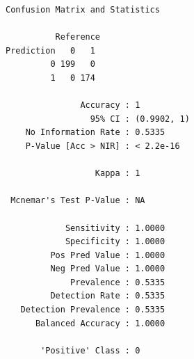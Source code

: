 \documentclass[
  letterpaper,
  DIV=11,
  numbers=noendperiod]{scrartcl}
\newenvironment{Shaded}{\begin{snugshade}}{\end{snugshade}}
\newcommand{\AttributeTok}[1]{\textcolor[rgb]{0.40,0.45,0.13}{#1}}
\newcommand{\FunctionTok}[1]{\textcolor[rgb]{0.28,0.35,0.67}{#1}}
\newcommand{\NormalTok}[1]{\textcolor[rgb]{0.00,0.23,0.31}{#1}}
\newcommand{\OtherTok}[1]{\textcolor[rgb]{0.00,0.23,0.31}{#1}}
\newcommand{\SpecialCharTok}[1]{\textcolor[rgb]{0.37,0.37,0.37}{#1}}
\begin{document}
\begin{verbatim}
Confusion Matrix and Statistics

          Reference
Prediction   0   1
         0 199   0
         1   0 174
                                     
               Accuracy : 1          
                 95% CI : (0.9902, 1)
    No Information Rate : 0.5335     
    P-Value [Acc > NIR] : < 2.2e-16  
                                     
                  Kappa : 1          
                                     
 Mcnemar's Test P-Value : NA         
                                     
            Sensitivity : 1.0000     
            Specificity : 1.0000     
         Pos Pred Value : 1.0000     
         Neg Pred Value : 1.0000     
             Prevalence : 0.5335     
         Detection Rate : 0.5335     
   Detection Prevalence : 0.5335     
      Balanced Accuracy : 1.0000     
                                     
       'Positive' Class : 0          
                                     
\end{verbatim}

\begin{Shaded}
\end{Shaded}
\end{document}
